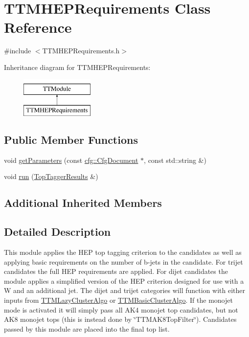 \hypertarget{classTTMHEPRequirements}{\section{T\-T\-M\-H\-E\-P\-Requirements Class Reference}
\label{classTTMHEPRequirements}
}


{\ttfamily \#include $<$T\-T\-M\-H\-E\-P\-Requirements.\-h$>$}

Inheritance diagram for T\-T\-M\-H\-E\-P\-Requirements\-:\begin{figure}[H]
\begin{center}
\leavevmode
\includegraphics[height=2.000000cm]{classTTMHEPRequirements}
\end{center}
\end{figure}
\subsection*{Public Member Functions}
\begin{DoxyCompactItemize}
\item 
void \hyperlink{classTTMHEPRequirements_ad86f4c8dc3dfc9b2a3925892e9ea82ec}{get\-Parameters} (const \hyperlink{classcfg_1_1CfgDocument}{cfg\-::\-Cfg\-Document} $\ast$, const std\-::string \&)
\item 
void \hyperlink{classTTMHEPRequirements_a5815a6c66595320c1d0f0f006dd67a4d}{run} (\hyperlink{classTopTaggerResults}{Top\-Tagger\-Results} \&)
\end{DoxyCompactItemize}
\subsection*{Additional Inherited Members}


\subsection{Detailed Description}
This module applies the H\-E\-P top tagging criterion to the candidates as well as applying basic requirements on the number of b-\/jets in the candidate. For trijet candidates the full H\-E\-P requirements are applied. For dijet candidates the module applies a simplified version of the H\-E\-P criterion designed for use with a W and an additional jet. The dijet and trijet categories will function with either inputs from \hyperlink{classTTMLazyClusterAlgo}{T\-T\-M\-Lazy\-Cluster\-Algo} or \hyperlink{classTTMBasicClusterAlgo}{T\-T\-M\-Basic\-Cluster\-Algo}. If the monojet mode is activated it will simply pass all A\-K4 monojet top candidates, but not A\-K8 monojet tops (this is instead done by \char`\"{}\-T\-T\-M\-A\-K8\-Top\-Filter\char`\"{}). Candidates passed by this module are placed into the final top list.



